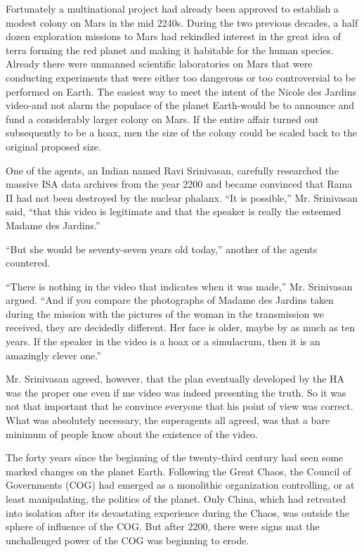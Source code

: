 \documentclass[]{article}
\begin{document}
{Fortunately a multinational project had already been approved to establish a modest colony on Mars in the mid 2240s.  During the two previous decades, a half dozen exploration missions to Mars had rekindled interest in the great idea of terra forming the red planet and making it habitable for the human species.  Already there were unmanned scientific laboratories on Mars that were conducting experiments that were either too dangerous or too controversial to be performed on Earth.  The easiest way to meet the intent of the Nicole des Jardins video-and not alarm the populace of the planet Earth-would be to announce and fund a considerably larger colony on Mars.  If the entire affair turned out subsequently to be a hoax, men the size of the colony could be scaled back to the original proposed size.

One of the agents, an Indian named Ravi Srinivasan, carefully researched the massive ISA data archives from the year 2200 and became convinced that Rama II had not been destroyed by the nuclear phalanx.  “It is possible,” Mr.  Srinivasan said, “that this video is legitimate and that the speaker is really the esteemed Madame des Jardins.”

“But she would be seventy-seven years old today,” another of the agents countered.

“There is nothing in the video that indicates when it was made,” Mr.  Srinivasan argued.  “And if you compare the photographs of Madame des Jardins taken during the mission with the pictures of the woman in the transmission we received, they are decidedly different.  Her face is older, maybe by as much as ten years.  If the speaker in the video is a hoax or a simulacrum, then it is an amazingly clever one.”

Mr.  Srinivasan agreed, however, that the plan eventually developed by the HA was the proper one even if me video was indeed presenting the truth.  So it was not that important that he convince everyone that his point of view was correct.  What was absolutely necessary, the superagents all agreed, was that a bare minimum of people know about the existence of the video.

The forty years since the beginning of the twenty-third century had seen some marked changes on the planet Earth.  Following the Great Chaos, the Council of Governments (COG) had emerged as a monolithic organization controlling, or at least manipulating, the politics of the planet.  Only China, which had retreated into isolation after its devastating experience during the Chaos, was outside the sphere of influence of the COG.  But after 2200, there were signs mat the unchallenged power of the COG was beginning to erode.

}
\end{document}
